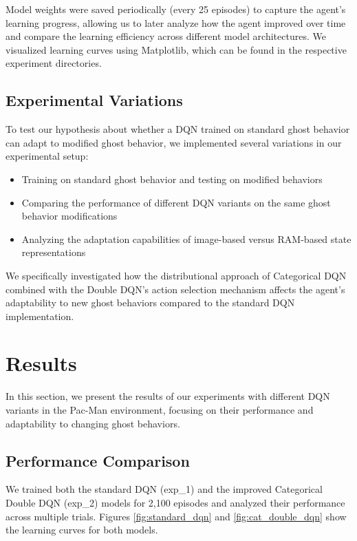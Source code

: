 \documentclass{article} %
\begin{document}
Model weights were saved periodically (every 25 episodes) to capture the agent's learning progress, allowing us to later analyze how the agent improved over time and compare the learning efficiency across different model architectures. We visualized learning curves using Matplotlib, which can be found in the respective experiment directories.

\subsection{Experimental Variations}

To test our hypothesis about whether a DQN trained on standard ghost behavior can adapt to modified ghost behavior, we implemented several variations in our experimental setup:
\begin{itemize}
  \item Training on standard ghost behavior and testing on modified behaviors
  \item Comparing the performance of different DQN variants on the same ghost behavior modifications
  \item Analyzing the adaptation capabilities of image-based versus RAM-based state representations
\end{itemize}

We specifically investigated how the distributional approach of Categorical DQN combined with the Double DQN's action selection mechanism affects the agent's adaptability to new ghost behaviors compared to the standard DQN implementation.

\section{Results}

In this section, we present the results of our experiments with different DQN variants in the Pac-Man environment, focusing on their performance and adaptability to changing ghost behaviors.

\subsection{Performance Comparison}

We trained both the standard DQN (exp\_1) and the improved Categorical Double DQN (exp\_2) models for 2,100 episodes and analyzed their performance across multiple trials. Figures \ref{fig:standard_dqn} and \ref{fig:cat_double_dqn} show the learning curves for both models.
\end{document}
